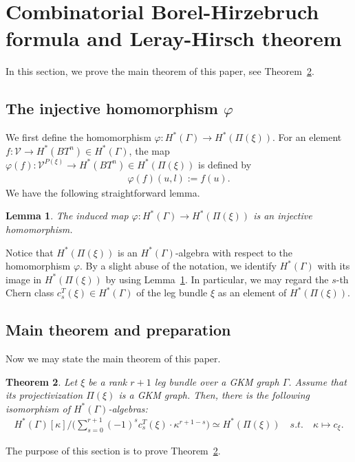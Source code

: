 \documentclass[12pt]{amsart}
\newtheorem{theorem}{Theorem}[section]
\newtheorem{lemma}[theorem]{Lemma}
\theoremstyle{definition}
\theoremstyle{remark}
\numberwithin{equation}{section}
\renewcommand{\phi}{\varphi}
\begin{document}
\section{Combinatorial Borel-Hirzebruch formula and Leray-Hirsch theorem}
\label{sect:5}

In this section, we prove the main theorem of this paper, see Theorem~\ref{main_theorem2}.

\subsection{The injective homomorphism $\varphi$}
\label{sect:5.1}

We first define the homomorphism $\varphi:H^{*}(\Gamma)\to H^{*}(\Pi(\xi))$.
For an element $f\colon \mathcal{V}\to H^{*}(BT^{n})\in H^{*}(\Gamma)$,
the map $\varphi(f)\colon \mathcal{V}^{P(\xi)}\to H^{*}(BT^{n})\in H^{*}(\Pi(\xi))$ is defined by
\begin{align}
\label{embedding}
\varphi(f)(u,l):=f(u).
\end{align}
We have the following straightforward lemma.
\begin{lemma}
\label{induced_hom}
The induced map $\varphi\colon H^{*}(\Gamma)\longrightarrow H^{*}(\Pi(\xi))$ is an injective homomorphism.
\end{lemma}
Notice that $H^{*}(\Pi(\xi))$ is an $H^{*}(\Gamma)$-algebra with respect to the homomorphism $\phi$.
By a slight abuse of the notation, we identify $H^{*}(\Gamma)$ with its image in $H^{*}(\Pi(\xi))$ by using Lemma~\ref{induced_hom}.
In particular, we may regard the $s$-th Chern class $c_{s}^{T}(\xi)\in H^{*}(\Gamma)$ of the leg bundle $\xi$ as an element of $H^{*}(\Pi(\xi))$.


\subsection{Main theorem and preparation}
\label{sect:5.2}

Now we may state the main theorem of this paper.
\begin{theorem}
\label{main_theorem2}
Let $\xi$ be a rank $r+1$ leg bundle over a GKM graph $\Gamma$.
Assume that its projectivization $\Pi(\xi)$ is a GKM graph.
Then, there is the following isomorphism of  $H^*(\Gamma)$-algebras:
\begin{align*}
H^{*}(\Gamma)[\kappa]\big/\biggl( \sum_{s=0}^{r+1} (-1)^{s}c_{s}^{T}(\xi) \cdot \kappa^{r+1-s} \biggr)\simeq H^{*}(\Pi(\xi))\quad s.t.\quad \kappa\mapsto c_{\xi}.
\end{align*}
\end{theorem}
The purpose of this section is to prove Theorem~\ref{main_theorem2}.
\end{document}
